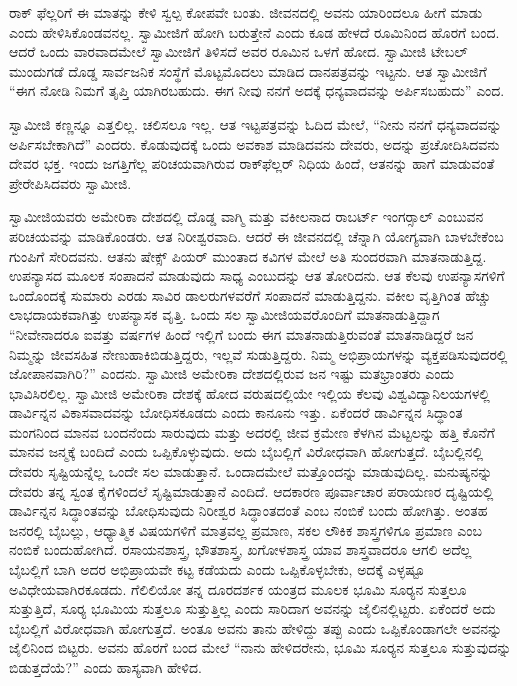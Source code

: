  ರಾಕ್ ಫೆಲ್ಲರಿಗೆ ಈ ಮಾತನ್ನು ಕೇಳಿ ಸ್ವಲ್ಪ ಕೋಪವೇ ಬಂತು. ಜೀವನದಲ್ಲಿ ಅವನು ಯಾರಿಂದಲೂ ಹೀಗೆ ಮಾಡು ಎಂದು ಹೇಳಿಸಿಕೊಂಡವನಲ್ಲ. ಸ್ವಾಮೀಜಿಗೆ ಹೋಗಿ ಬರುತ್ತೇನೆ ಎಂದು ಕೂಡ ಹೇಳದೆ ರೂಮಿನಿಂದ ಹೊರಗೆ ಬಂದ. ಆದರೆ ಒಂದು ವಾರವಾದಮೇಲೆ ಸ್ವಾಮೀಜಿಗೆ ತಿಳಿಸದೆ ಅವರ ರೂಮಿನ ಒಳಗೆ ಹೋದ. ಸ್ವಾಮೀಜಿ ಟೇಬಲ್ ಮುಂದುಗಡೆ ದೊಡ್ಡ ಸಾರ್ವಜನಿಕ ಸಂಸ್ಥೆಗೆ ಮೊಟ್ಟಮೊದಲು ಮಾಡಿದ ದಾನಪತ್ರವನ್ನು ಇಟ್ಟನು. ಆತ ಸ್ವಾಮೀಜಿಗೆ “ಈಗ ನೋಡಿ ನಿಮಗೆ ತೃಪ್ತಿ ಯಾಗಿರಬಹುದು. ಈಗ ನೀವು ನನಗೆ ಅದಕ್ಕೆ ಧನ್ಯವಾದವನ್ನು ಅರ್ಪಿಸಬಹುದು” ಎಂದ. 

 ಸ್ವಾಮೀಜಿ ಕಣ್ಣನ್ನೂ ಎತ್ತಲಿಲ್ಲ. ಚಲಿಸಲೂ ಇಲ್ಲ. ಆತ ಇಟ್ಟಪತ್ರವನ್ನು ಓದಿದ ಮೇಲೆ, “ನೀನು ನನಗೆ ಧನ್ಯವಾದವನ್ನು ಅರ್ಪಿಸಬೇಕಾಗಿದೆ” ಎಂದರು. ಕೊಡುವುದಕ್ಕೆ ಒಂದು ಅವಕಾಶ ಮಾಡಿದವನು ದೇವರು, ಅದನ್ನು ಪ್ರಚೋದಿಸಿದವನು ದೇವರ ಭಕ್ತ. ಇಂದು ಜಗತ್ತಿಗೆಲ್ಲ ಪರಿಚಯವಾಗಿರುವ ರಾಕ್‍ಫೆಲ್ಲರ್ ನಿಧಿಯ ಹಿಂದೆ, ಆತನನ್ನು ಹಾಗೆ ಮಾಡುವಂತೆ ಪ್ರೇರೇಪಿಸಿದವರು ಸ್ವಾಮೀಜಿ. 

 ಸ್ವಾಮೀಜಿಯವರು ಅಮೇರಿಕಾ ದೇಶದಲ್ಲಿ ದೊಡ್ಡ ವಾಗ್ಮಿ ಮತ್ತು ವಕೀಲನಾದ ರಾಬರ್ಟ್ ಇಂಗರ್‍ಸಾಲ್ ಎಂಬುವನ ಪರಿಚಯವನ್ನು ಮಾಡಿಕೊಂಡರು. ಆತ ನಿರೀಶ್ವರವಾದಿ. ಆದರೆ ಈ ಜೀವನದಲ್ಲಿ ಚೆನ್ನಾಗಿ ಯೋಗ್ಯವಾಗಿ ಬಾಳಬೇಕೆಂಬ ಗುಂಪಿಗೆ ಸೇರಿದವನು. ಆತನು ಷೇಕ್ಸ್ ಪಿಯರ್ ಮುಂತಾದ ಕವಿಗಳ ಮೇಲೆ ಅತಿ ಸುಂದರವಾಗಿ ಮಾತನಾಡುತ್ತಿದ್ದ. ಉಪನ್ಯಾಸದ ಮೂಲಕ ಸಂಪಾದನೆ ಮಾಡುವುದು ಸಾಧ್ಯ ಎಂಬುದನ್ನು ಆತ ತೋರಿದನು. ಆತ ಕೆಲವು ಉಪನ್ಯಾಸಗಳಿಗೆ ಒಂದೊಂದಕ್ಕೆ ಸುಮಾರು ಎರಡು ಸಾವಿರ ಡಾಲರುಗಳವರೆಗೆ ಸಂಪಾದನೆ ಮಾಡುತ್ತಿದ್ದನು. ವಕೀಲ ವೃತ್ತಿಗಿಂತ ಹೆಚ್ಚು ಲಾಭದಾಯಕವಾಗಿತ್ತು ಉಪನ್ಯಾಸಕ ವೃತ್ತಿ. ಒಂದು ಸಲ ಸ್ವಾಮೀಜಿಯವರೊಂದಿಗೆ ಮಾತನಾಡುತ್ತಿದ್ದಾಗ “ನೀವೇನಾದರೂ ಐವತ್ತು ವರ್ಷಗಳ ಹಿಂದೆ ಇಲ್ಲಿಗೆ ಬಂದು ಈಗ ಮಾತನಾಡುತ್ತಿರುವಂತೆ ಮಾತನಾಡಿದ್ದರೆ ಜನ ನಿಮ್ಮನ್ನು ಜೀವಸಹಿತ ನೇಣುಹಾಕಿಬಿಡುತ್ತಿದ್ದರು, ಇಲ್ಲವೆ ಸುಡುತ್ತಿದ್ದರು. ನಿಮ್ಮ ಅಭಿಪ್ರಾಯಗಳನ್ನು ವ್ಯಕ್ತಪಡಿಸುವುದರಲ್ಲಿ ಜೋಪಾನವಾಗಿರಿ?” ಎಂದನು. ಸ್ವಾಮೀಜಿ ಅಮೇರಿಕಾ ದೇಶದಲ್ಲಿರುವ ಜನ ಇಷ್ಟು ಮತಭ್ರಾಂತರು ಎಂದು ಭಾವಿಸಿರಲಿಲ್ಲ. ಸ್ವಾಮೀಜಿ ಅಮೇರಿಕಾ ದೇಶಕ್ಕೆ ಹೋದ ವರುಷದಲ್ಲಿಯೇ ಇಲ್ಲಿಯ ಕೆಲವು ವಿಶ್ವವಿದ್ಯಾನಿಲಯಗಳಲ್ಲಿ ಡಾರ್ವಿನ್ನನ ವಿಕಾಸವಾದವನ್ನು ಬೋಧಿಸಕೂಡದು ಎಂದು ಕಾನೂನು ಇತ್ತು. ಏಕೆಂದರೆ ಡಾರ್ವಿನ್ನನ ಸಿದ್ಧಾಂತ ಮಂಗನಿಂದ ಮಾನವ ಬಂದನೆಂದು ಸಾರುವುದು ಮತ್ತು ಅದರಲ್ಲಿ ಜೀವ ಕ್ರಮೇಣ ಕೆಳಗಿನ ಮೆಟ್ಟಲನ್ನು ಹತ್ತಿ ಕೊನೆಗೆ ಮಾನವ ಜನ್ಮಕ್ಕೆ ಬಂದಿದೆ ಎಂದು ಒಪ್ಪಿಕೊಳ್ಳುವುದು. ಅದು ಬೈಬಲ್ಲಿಗೆ ವಿರೋಧವಾಗಿ ಹೋಗುತ್ತದೆ. ಬೈಬಲ್ಲಿನಲ್ಲಿ ದೇವರು ಸೃಷ್ಟಿಯನ್ನೆಲ್ಲ ಒಂದೇ ಸಲ ಮಾಡುತ್ತಾನೆ. ಒಂದಾದಮೇಲೆ ಮತ್ತೊಂದನ್ನು ಮಾಡುವುದಿಲ್ಲ. ಮನುಷ್ಯನನ್ನು ದೇವರು ತನ್ನ ಸ್ವಂತ ಕೈಗಳಿಂದಲೆ ಸೃಷ್ಟಿಮಾಡುತ್ತಾನೆ ಎಂದಿದೆ. ಆದಕಾರಣ ಪೂರ್ವಾಚಾರ ಪರಾಯಣರ ದೃಷ್ಟಿಯಲ್ಲಿ ಡಾರ್ವಿನ್ನನ ಸಿದ್ಧಾಂತವನ್ನು ಬೋಧಿಸುವುದು ನಿರೀಶ್ವರ ಸಿದ್ಧಾಂತದಂತೆ ಎಂಬ ನಂಬಿಕೆ ಬಂದು ಹೋಗಿತ್ತು. ಅಂತಹ ಜನರಲ್ಲಿ ಬೈಬಲ್ಲು, ಆಧ್ಯಾತ್ಮಿಕ ವಿಷಯಗಳಿಗೆ ಮಾತ್ರವಲ್ಲ ಪ್ರಮಾಣ, ಸಕಲ ಲೌಕಿಕ ಶಾಸ್ತ್ರಗಳಿಗೂ ಪ್ರಮಾಣ ಎಂಬ ನಂಬಿಕೆ ಬಂದುಹೋಗಿದೆ. ರಸಾಯನಶಾಸ್ತ್ರ, ಭೌತಶಾಸ್ತ್ರ, ಖಗೋಳಶಾಸ್ತ್ರ ಯಾವ ಶಾಸ್ತ್ರವಾದರೂ ಆಗಲಿ ಅದೆಲ್ಲ ಬೈಬಲ್ಲಿಗೆ ಬಾಗಿ ಅದರ ಅಭಿಪ್ರಾಯವೇ ಕಟ್ಟ ಕಡೆಯದು ಎಂದು ಒಪ್ಪಿಕೊಳ್ಳಬೇಕು, ಅದಕ್ಕೆ ಎಳ್ಳಷ್ಟೂ ಅವಿಧೇಯವಾಗಿರಕೂಡದು. ಗೆಲಿಲಿಯೋ ತನ್ನ ದೂರದರ್ಶಕ ಯಂತ್ರದ ಮೂಲಕ ಭೂಮಿ ಸೂರ‍್ಯನ ಸುತ್ತಲೂ ಸುತ್ತುತ್ತಿದೆ, ಸೂರ‍್ಯ ಭೂಮಿಯ ಸುತ್ತಲೂ ಸುತ್ತುತ್ತಿಲ್ಲ ಎಂದು ಸಾರಿದಾಗ ಅವನನ್ನು ಜೈಲಿನಲ್ಲಿಟ್ಟರು. ಏಕೆಂದರೆ ಅದು ಬೈಬಲ್ಲಿಗೆ ವಿರೋಧವಾಗಿ ಹೋಗುತ್ತದೆ. ಅಂತೂ ಅವನು ತಾನು ಹೇಳಿದ್ದು ತಪ್ಪು ಎಂದು ಒಪ್ಪಿಕೊಂಡಾಗಲೇ ಅವನನ್ನು ಜೈಲಿನಿಂದ ಬಿಟ್ಟರು. ಅವನು ಹೊರಗೆ ಬಂದ ಮೇಲೆ “ನಾನು ಹೇಳಿದರೇನು, ಭೂಮಿ ಸೂರ‍್ಯನ ಸುತ್ತಲೂ ಸುತ್ತುವುದನ್ನು ಬಿಡುತ್ತದೆಯೆ?” ಎಂದು ಹಾಸ್ಯವಾಗಿ ಹೇಳಿದ. 

